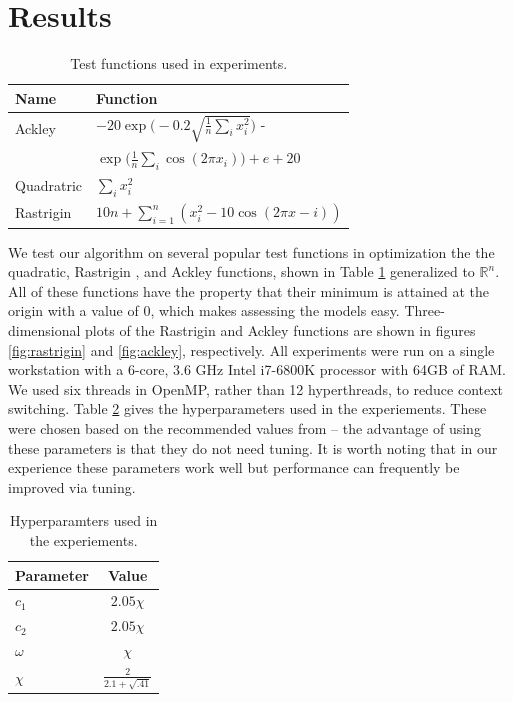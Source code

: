 \section{Results}\label{sec:results}
\begin{table}
  \centering
  \caption{Test functions used in experiments.}\label{tab:functions}
  \begin{tabular}{ll}\toprule
    \textbf{Name} & \textbf{Function}\\\midrule
    Ackley & $-20\exp\Big(-0.2\sqrt{\frac{1}{n}\sum_ix_i^2}\Big)$ -\\
    & \hspace{5mm} $\exp\Big(\frac{1}{n}\sum_i\cos(2\pi x_i)\Big) + e + 20$\\
    Quadratric & $\sum_i x_i^2$\\
    Rastrigin & $10n + \sum_{i=1}^n(x_i^2 - 10\cos(2\pi x - i))$\\\bottomrule
  \end{tabular}
\end{table}
We test our algorithm on several popular test functions in optimization
\cite{testprobs} the the quadratic, Rastrigin
\cite{rastrigin}, and Ackley \cite{ackley} functions, shown in Table
\ref{tab:functions} generalized to $\mathbb{R}^n$. All of these functions have
the property that their minimum is attained at the origin with a value of
$0$, which makes assessing the models easy. Three-dimensional plots of the
Rastrigin and Ackley functions are shown in figures \ref{fig:rastrigin} and
\ref{fig:ackley}, respectively.
All experiments were run on a single
workstation with a 6-core, 3.6 GHz Intel i7-6800K processor with 64GB of RAM. We
used six threads in OpenMP, rather than 12 hyperthreads, to reduce context switching.
Table \ref{tab:param}
gives the hyperparameters used in the experiements. These were chosen based on
the recommended values from \cite{pso-convergence, spso} -- the advantage of
using these parameters is that they do not need tuning. It is
worth noting that in our experience these parameters work well but performance
can frequently be improved via tuning.

\begin{table}
  \centering
  \caption{Hyperparamters used in the experiements.}\label{tab:param}
  \begin{tabular}{lc}\toprule
    \textbf{Parameter} & \textbf{Value}\\\midrule
    $c_1$ & $2.05 \chi$\\
    $c_2$ & $2.05 \chi$\\
    $\omega$ & $\chi$\\
    $\chi$ & $\frac{2}{2.1 + \sqrt{.41}}$\\\bottomrule
    \end{tabular}
\end{table}

